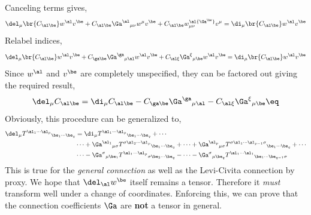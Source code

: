 \documentclass{article}
\begin{document}
Canceling terms gives,
\[\del_\mu \br{C_{\al\be}} w^\al v^\be + C_{\al\be} {\Ga^\al}_{\mu\nu} w^\mu v^\be + C_{\al\be} w^\al {\Ga^\be}_{\mu\nu} v^\mu = \di_\mu \br{C_{\al\be}} w^\al v^\be\]
Relabel indices,
\[\del_\mu \br{C_{\al\be}} w^\al v^\be + C_{\ga\be} {\Ga^\ga}_{\mu\al} w^\al v^\be + C_{\al\xi}  {\Ga^\xi}_{\mu\be} w^\al v^\be = \di_\mu \br{C_{\al\be}} w^\al v^\be\]
Since $w^\al$ and $v^\be$ are completely unspecified, they can be factored out giving the required result,
\[\del_\mu C_{\al\be} = \di_\mu C_{\al\be} - C_{\ga\be} {\Ga^\ga}_{\mu\al}  - C_{\al\xi}  {\Ga^\xi}_{\mu\be} \eq \label{eq:metricderivative} \]
Obviously, this procedure can be generalized to,
\begin{align*}
\del_\mu {T^{\al_1 \cdots \al_p}}_{\be_1\cdots\be_q} &= \di_\mu {T^{\al_1 \cdots \al_p}}_{\be_1\cdots\be_q} + \cdots \\
 &\cdots + {\Ga^{\al_1}}_{\mu\sigma}{T^{\sigma \al_2 \cdots \al_p}}_{\be_1\cdots\be_q} + \cdots + {\Ga^{\al_p}}_{\mu\sigma}{T^{\sigma \al_1 \cdots \al_{p-1} \sigma}}_{\be_1\cdots\be_q} + \cdots \\
 &\cdots - {\Ga^{\sigma}}_{\mu\be_1}{T^{\al_1 \cdots \al_p}}_{\sigma\be_2\cdots\be_q} - \cdots - {\Ga^{\sigma}}_{\mu\be_q}{T^{\al_1 \cdots \al_1}}_{\be_1\cdots\be_{q-1}\sigma} \\
\end{align*}
This is true for the \textit{general connection} as well as the Levi-Civita connection by proxy.
\newcommand{\tx}{\ti{x}}
\newcommand{\tw}{\ti{w}}
We hope that $\del_\al w^\be$ itself remains a tensor. Therefore it \textit{must} transform well under a change of coordinates. Enforcing this, we can prove that the connection coefficients $\Ga$ are \textbf{not} a tensor in general. \\
\end{document}
